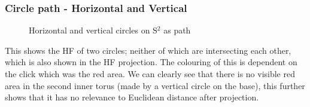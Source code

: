 \documentclass[12pt]{article} %
\begin{document}
\begin{flushleft}
\subsubsection{Circle path - Horizontal and Vertical} %
\begin{figure}[H] %
\caption{Horizontal and vertical circles on S$^{2}$ as path}
\label{fig:speciation}
\end{figure}
This shows the HF of two circles; neither of which are intersecting each other, which is also shown in the HF projection. The colouring of this is dependent on the click which was the red area. We can clearly see that there is no visible red area in the second inner torus (made by a vertical circle on the base), this further shows that it has no relevance to Euclidean distance after projection.

\end{flushleft}
\end{document}
